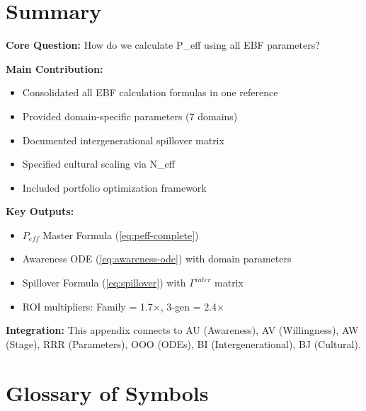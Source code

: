 \section{Summary}
\label{sec:calc-summary}

\begin{tcolorbox}[colback=green!10!white, colframe=green!75!black,
    title=\textbf{Appendix BK: Summary}]

\textbf{Core Question:} How do we calculate P\_eff using all EBF parameters?

\textbf{Main Contribution:}
\begin{itemize}[nosep]
    \item Consolidated all EBF calculation formulas in one reference
    \item Provided domain-specific parameters (7 domains)
    \item Documented intergenerational spillover matrix
    \item Specified cultural scaling via N\_eff
    \item Included portfolio optimization framework
\end{itemize}

\textbf{Key Outputs:}
\begin{itemize}[nosep]
    \item $P_{eff}$ Master Formula (\ref{eq:peff-complete})
    \item Awareness ODE (\ref{eq:awareness-ode}) with domain parameters
    \item Spillover Formula (\ref{eq:spillover}) with $\Gamma^{inter}$ matrix
    \item ROI multipliers: Family = 1.7×, 3-gen = 2.4×
\end{itemize}

\textbf{Integration:} This appendix connects to AU (Awareness), AV (Willingness),
AW (Stage), RRR (Parameters), OOO (ODEs), BI (Intergenerational), BJ (Cultural).

\end{tcolorbox}


\section{Glossary of Symbols}
\label{sec:calc-glossary}

